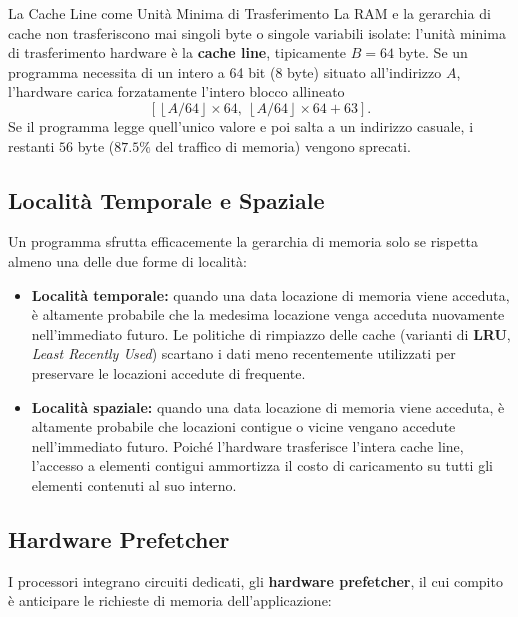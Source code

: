 \begin{noteblock}{La Cache Line come Unit\`a Minima di Trasferimento}
La RAM e la gerarchia di cache non trasferiscono mai singoli byte o singole variabili isolate: l'unit\`a minima di trasferimento hardware \`e la \textbf{cache line}, tipicamente $B = 64$ byte. Se un programma necessita di un intero a 64 bit ($8$ byte) situato all'indirizzo $A$, l'hardware carica forzatamente l'intero blocco allineato
\[
\left[\left\lfloor A / 64 \right\rfloor \times 64,\ \left\lfloor A / 64 \right\rfloor \times 64 + 63\right].
\]
Se il programma legge quell'unico valore e poi salta a un indirizzo casuale, i restanti $56$ byte ($87.5\%$ del traffico di memoria) vengono sprecati.
\end{noteblock}

\subsection{Localit\`a Temporale e Spaziale}

Un programma sfrutta efficacemente la gerarchia di memoria solo se rispetta almeno una delle due forme di localit\`a:

\begin{itemize}
    \item \textbf{Localit\`a temporale:} quando una data locazione di memoria viene acceduta, \`e altamente probabile che la medesima locazione venga acceduta nuovamente nell'immediato futuro. Le politiche di rimpiazzo delle cache (varianti di \textbf{LRU}, \textit{Least Recently Used}) scartano i dati meno recentemente utilizzati per preservare le locazioni accedute di frequente.
    \item \textbf{Localit\`a spaziale:} quando una data locazione di memoria viene acceduta, \`e altamente probabile che locazioni contigue o vicine vengano accedute nell'immediato futuro. Poich\'e l'hardware trasferisce l'intera cache line, l'accesso a elementi contigui ammortizza il costo di caricamento su tutti gli elementi contenuti al suo interno.
\end{itemize}

\subsection{Hardware Prefetcher}

I processori integrano circuiti dedicati, gli \textbf{hardware prefetcher}, il cui compito \`e anticipare le richieste di memoria dell'applicazione:

